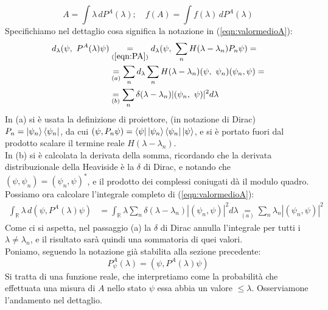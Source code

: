 \documentclass[../../FisicaTeorica.tex]{subfiles}
\begin{document}
\begin{equation}
A=\int \lambda\, dP^A(\lambda); \quad f(A) = \int f(\lambda)\,dP^A(\lambda)
\label{eqn:operatoreformale}
\end{equation}
Specifichiamo nel dettaglio cosa significa la notazione in (\ref{eqn:valormedioA}):
\begin{align}
d_\lambda (\psi,\ P^A (\lambda )\psi )&\underset{(\ref{eqn:PA})}{=}d_\lambda (\psi,\ \sum_{n} H(\lambda-\lambda_n )P_n\psi )=\nonumber\\
&\underset{(a)}{=}\sum_{n} d_\lambda\sum_{n} H (\lambda-\lambda_n ) (\psi,\ \psi_n ) (\psi_n,\psi )=
\label{eqn:dPA_op}
\\
&\underset{(b)}{=}\sum_n \delta (\lambda-\lambda_n ) |(\psi_n,\ \psi)|^2 d\lambda\nonumber
\end{align}
In (a) si è usata la definizione di proiettore, (in notazione di Dirac) $P_n = \ket{\psi_n}\bra{\psi_n}$, da cui $(\psi, P_n \psi) = \bra{\psi}\ket{\psi_n}\bra{\psi_n}\ket{\psi}$, e si è portato fuori dal prodotto scalare il termine reale $H(\lambda-\lambda_n)$.\\
In (b) si è calcolata la derivata della somma, ricordando che la derivata distribuzionale della Heaviside è la $\delta$ di Dirac, e notando che $(\psi, \psi_n) = (\psi_n,\psi)^*$, e il prodotto dei complessi coniugati dà il modulo quadro.\\
Possiamo ora calcolare l'integrale completo di (\ref{eqn:valormedioA}):
\begin{align*}
\int_{\mathbb{R}}\lambda\,d (\psi,P^A (\lambda )\psi )&=\int_{\mathbb{R}}\lambda\sum_{n}\delta (\lambda-\lambda_n )
 |(\psi_n,\psi)|^2 d\lambda\underset{(a)}{=}\sum_{n}\lambda_n |(\psi_n,\psi)|^2
\end{align*}
Come ci si aspetta, nel passaggio (a) la $\delta$ di Dirac annulla l'integrale per tutti i $\lambda\neq \lambda_n$, e il risultato sarà quindi una sommatoria di quei valori.\\
Poniamo, seguendo la notazione già stabilita alla sezione precedente:
\[ 
P_\psi^A(\lambda) = (\psi, P^A(\lambda)\psi)
\]
Si tratta di una funzione reale, che interpretiamo come la probabilità che effettuata una misura di $A$ nello stato $\psi$ essa abbia un valore $\leq \lambda$. Osserviamone l'andamento nel dettaglio.
\end{document}

